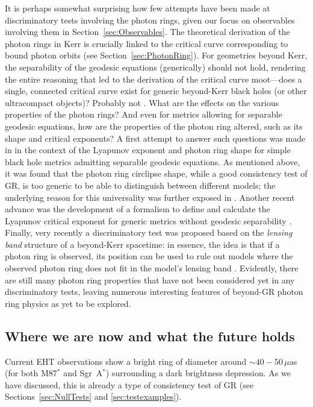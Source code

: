 \documentclass[graybox,envcountchap]{svmult}
\begin{document}
It is perhaps somewhat surprising how few attempts have been made at discriminatory tests involving the photon rings, given our focus on observables involving them in Section~\ref{sec:Observables}.
The theoretical derivation of the photon rings in Kerr is crucially linked to the critical curve corresponding to bound photon orbits (see Section~\ref{sec:PhotonRing}).
For geometries beyond Kerr, the separability of the geodesic equations (generically) should not hold, rendering the entire reasoning that led to the derivation of the critical curve moot---does a single, connected critical curve exist for generic beyond-Kerr black holes (or other ultracompact objects)?
Probably not \cite{Staelens2023}.
What are the effects on the various properties of the photon rings?
And even for metrics allowing for separable geodesic equations, how are the properties of the photon ring altered, such as its shape and critical exponents?
A first attempt to answer such questions was made in \cite{Staelens2023} in the context of the Lyapunov exponent and photon ring shape for simple black hole metrics admitting separable geodesic equations.
As mentioned above, it was found that the photon ring circlipse shape, while a good consistency test of GR, is too generic to be able to distinguish between different models; the underlying reason for this universality was further exposed in \cite{universality}.
Another recent advance was the development of a formalism to define and calculate the Lyapunov critical exponent for generic metrics without geodesic separability \cite{Deich2023}.
Finally, very recently a discriminatory test was proposed based on the \emph{lensing band} structure of a beyond-Kerr spacetime: in essence, the idea is that if a photon ring is observed, its position can be used to rule out models where the observed photon ring does not fit in the model's lensing band \cite{CardenasAvendano2024}.
Evidently, there are still many photon ring properties that have not been considered yet in any discriminatory tests, leaving numerous interesting features of beyond-GR photon ring physics as yet to be explored.

\subsection{Where we are now and what the future holds}\label{sec:Future}

Current EHT observations show a bright ring of diameter around $\sim40-50\,\mu$as (for both M87$^*$ and Sgr~A$^*$) surrounding a dark brightness depression.
As we have discussed, this is already a type of consistency test of GR (see Sections~\ref{sec:NullTests} and \ref{sec:testexamples}).
\end{document}

